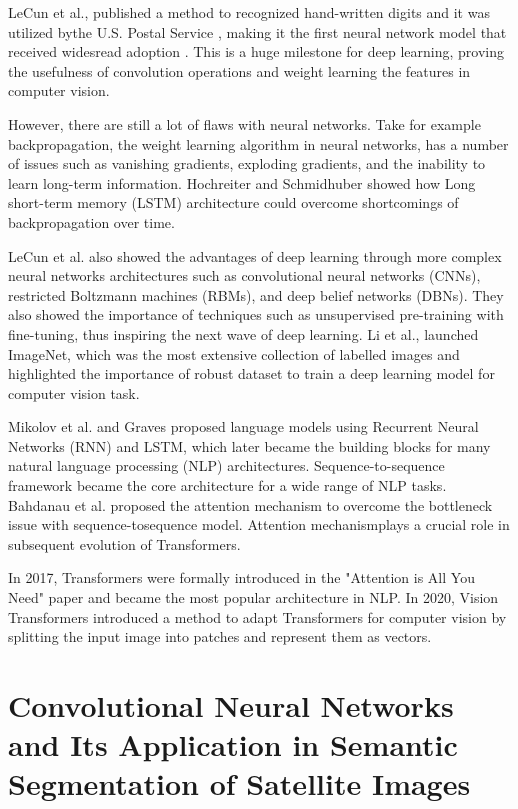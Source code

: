 LeCun et al., published a method to recognized hand-written digits and it was utilized bythe U.S. Postal Service \cite{LeCunBoserDenkerEtAl89}, making it the first neural network model that received widesread adoption . This is a huge milestone for deep learning, proving the usefulness of convolution operations and weight learning the features in computer vision.

However, there are still a lot of flaws with neural networks. Take for example backpropagation, the weight learning algorithm in neural networks, has a number of issues such as vanishing gradients, exploding gradients, and the inability to learn long-term information. Hochreiter and Schmidhuber showed how  Long short-term memory (LSTM) architecture could overcome shortcomings of backpropagation over time.

LeCun et al. also showed the advantages of deep learning through more complex neural networks architectures such as convolutional neural networks (CNNs), restricted Boltzmann machines (RBMs), and deep belief networks (DBNs). They also showed the importance of techniques such as unsupervised pre-training
with fine-tuning, thus inspiring the next wave of deep learning. Li et al.,  launched ImageNet, which was the most extensive collection of labelled images and highlighted the importance of robust dataset to train a deep learning model for computer vision task. 

Mikolov et al. and Graves proposed language models using Recurrent Neural Networks (RNN) and LSTM, which later became the building blocks for many natural language processing (NLP) architectures. Sequence-to-sequence framework became the core architecture for a wide range of NLP tasks. Bahdanau et al. proposed the attention mechanism to overcome the bottleneck issue with sequence-tosequence model. Attention mechanismplays a crucial role in subsequent evolution of Transformers.

In 2017, Transformers were formally introduced in the "Attention is All You Need" paper \cite{attention-is-all-you-need} and became the most popular architecture in NLP. In 2020, Vision Transformers \cite{16x16} introduced a method to adapt Transformers for computer vision by splitting the input image into patches and represent them as vectors.

\section{Convolutional Neural Networks and Its Application in Semantic Segmentation of Satellite Images}

